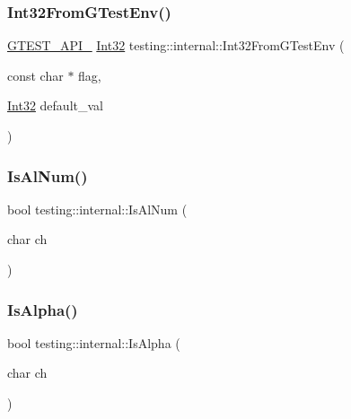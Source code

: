 \mbox{\label{namespacetesting_1_1internal_a227ce16736a6992fcd13ac3cd23ef1f1}} 
\subsubsection{\texorpdfstring{Int32FromGTestEnv()}{Int32FromGTestEnv()}}
{\footnotesize\ttfamily \mbox{\hyperlink{gtest-port_8h_aa73be6f0ba4a7456180a94904ce17790}{G\+T\+E\+S\+T\+\_\+\+A\+P\+I\+\_\+}} \mbox{\hyperlink{namespacetesting_1_1internal_a8ee38faaf875f133358abaf9bc056cec}{Int32}} testing\+::internal\+::\+Int32\+From\+G\+Test\+Env (\begin{DoxyParamCaption}\item[{const char $\ast$}]{flag,  }\item[{\mbox{\hyperlink{namespacetesting_1_1internal_a8ee38faaf875f133358abaf9bc056cec}{Int32}}}]{default\+\_\+val }\end{DoxyParamCaption})}

\mbox{\label{namespacetesting_1_1internal_a83802e7f23324cd512232203662e1a98}} 
\subsubsection{\texorpdfstring{IsAlNum()}{IsAlNum()}}
{\footnotesize\ttfamily bool testing\+::internal\+::\+Is\+Al\+Num (\begin{DoxyParamCaption}\item[{char}]{ch }\end{DoxyParamCaption})\hspace{0.3cm}{\ttfamily [inline]}}

\mbox{\label{namespacetesting_1_1internal_aeb957087fd6bbf9db98ab7cd41b0c129}} 
\subsubsection{\texorpdfstring{IsAlpha()}{IsAlpha()}}
{\footnotesize\ttfamily bool testing\+::internal\+::\+Is\+Alpha (\begin{DoxyParamCaption}\item[{char}]{ch }\end{DoxyParamCaption})\hspace{0.3cm}{\ttfamily [inline]}}

